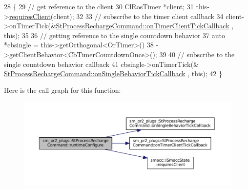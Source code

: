 \begin{DoxyCode}
28     \{
29         \textcolor{comment}{// get reference to the client}
30         ClRosTimer *client;
31         this->\hyperlink{classsmacc_1_1ISmaccState_a7f95c9f0a6ea2d6f18d1aec0519de4ac}{requiresClient}(client);
32 
33         \textcolor{comment}{// subscribe to the timer client callback}
34         client->onTimerTick(&\hyperlink{structsm__pr2__plugs_1_1StProcessRechargeCommand_a71c620cbe618019ad7338c9b88639c68}{StProcessRechargeCommand::onTimerClientTickCallback}
      , \textcolor{keyword}{this});
35 
36         \textcolor{comment}{// getting reference to the single countdown behavior}
37         \textcolor{keyword}{auto} *cbsingle = this->getOrthogonal<OrTimer>()
38                              ->getClientBehavior<CbTimerCountdownOnce>();
39 
40         \textcolor{comment}{// subscribe to the single countdown behavior callback}
41         cbsingle->onTimerTick(&
      \hyperlink{structsm__pr2__plugs_1_1StProcessRechargeCommand_acc2a9e8dbb67f236e16eafb4db51c3c5}{StProcessRechargeCommand::onSingleBehaviorTickCallback}
      , \textcolor{keyword}{this});
42     \}
\end{DoxyCode}
Here is the call graph for this function\+:
\nopagebreak
\begin{figure}[H]
\begin{center}
\leavevmode
\includegraphics[width=350pt]{structsm__pr2__plugs_1_1StProcessRechargeCommand_ae401a2e897f446ddbde833e7686fcd7a_cgraph}
\end{center}
\end{figure}
\mbox{\label{structsm__pr2__plugs_1_1StProcessRechargeCommand_ad4c6ec976c76402dd0fe6002036d2462}} 

